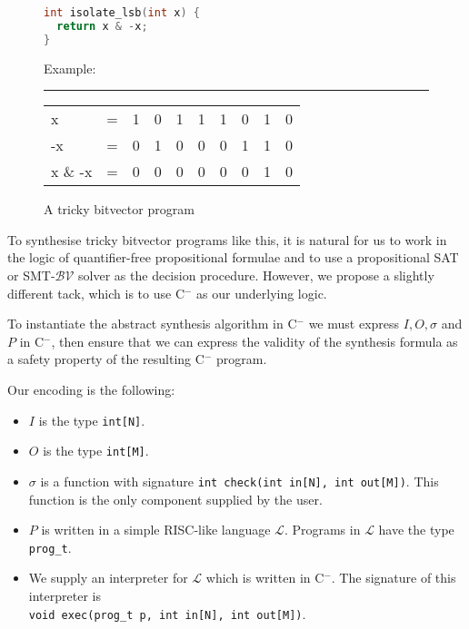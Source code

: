 \documentclass[a4paper]{llncs}
\newcommand{\newC}{C$^-$\xspace}
\begin{document}
\begin{figure}
\centering
\begin{minipage}{0.45\linewidth}
 \begin{lstlisting}[language=C]
int isolate_lsb(int x) {
  return x & -x;
}
 \end{lstlisting}
\end{minipage}
\begin{minipage}{0.45\linewidth}
 
Example:

\hrule

\begin{tabular}{llcccccccc}
 x       & = & 1 & 0 & 1 & 1 & 1 & 0 & 1 & 0 \\
 -x      & = & 0 & 1 & 0 & 0 & 0 & 1 & 1 & 0 \\
 x \& -x & = & 0 & 0 & 0 & 0 & 0 & 0 & 1 & 0
\end{tabular}
\end{minipage}


 \caption{A tricky bitvector program}
  \label{fig:bitvector-program}
\end{figure}


To synthesise tricky bitvector programs like this, it is natural for us to
work in the logic of quantifier-free propositional formulae and to use a
propositional SAT or SMT-$\mathcal{BV}$ solver as the decision procedure. 
However, we propose a slightly different tack, which is to use \newC as
our underlying logic.

To instantiate the abstract synthesis algorithm in \newC we must express $I, O,
\sigma$ and $P$ in \newC, then ensure that we can express the validity of the
synthesis formula as a safety property of the resulting \newC program.

Our encoding is the following:
%
\begin{itemize}
 \item $I$ is the type \verb|int[N]|.
 \item $O$ is the type \verb|int[M]|.
 \item $\sigma$ is a function with signature
 \verb|int check(int in[N], int out[M])|. This function is the only component supplied
 by the user.
 \item $P$ is written in a simple RISC-like language $\mathcal{L}$.  Programs in $\mathcal{L}$
 have the type \verb|prog_t|.
 \item We supply an interpreter for $\mathcal{L}$ which is written in \newC.  The signature
 of this interpreter is \\
 \verb|void exec(prog_t p, int in[N], int out[M])|.
\end{itemize}
\end{document}
